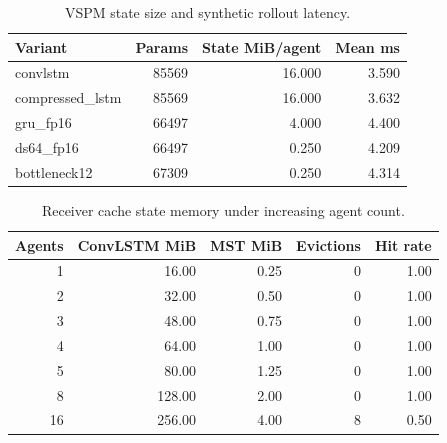 \begin{table}[t]
\centering
\caption{VSPM state size and synthetic rollout latency.}
\label{tab:vspm-profile}
\begin{tabular}{lrrr}
\toprule
Variant & Params & State MiB/agent & Mean ms \\
\midrule
convlstm & 85569 & 16.000 & 3.590 \\
compressed\_lstm & 85569 & 16.000 & 3.632 \\
gru\_fp16 & 66497 & 4.000 & 4.400 \\
ds64\_fp16 & 66497 & 0.250 & 4.209 \\
bottleneck12 & 67309 & 0.250 & 4.314 \\
\bottomrule
\end{tabular}
\end{table}

\begin{table}[t]
\centering
\caption{Receiver cache state memory under increasing agent count.}
\label{tab:cache-scalability}
\begin{tabular}{rrrrr}
\toprule
Agents & ConvLSTM MiB & MST MiB & Evictions & Hit rate \\
\midrule
1 & 16.00 & 0.25 & 0 & 1.00 \\
2 & 32.00 & 0.50 & 0 & 1.00 \\
3 & 48.00 & 0.75 & 0 & 1.00 \\
4 & 64.00 & 1.00 & 0 & 1.00 \\
5 & 80.00 & 1.25 & 0 & 1.00 \\
8 & 128.00 & 2.00 & 0 & 1.00 \\
16 & 256.00 & 4.00 & 8 & 0.50 \\
\bottomrule
\end{tabular}
\end{table}

